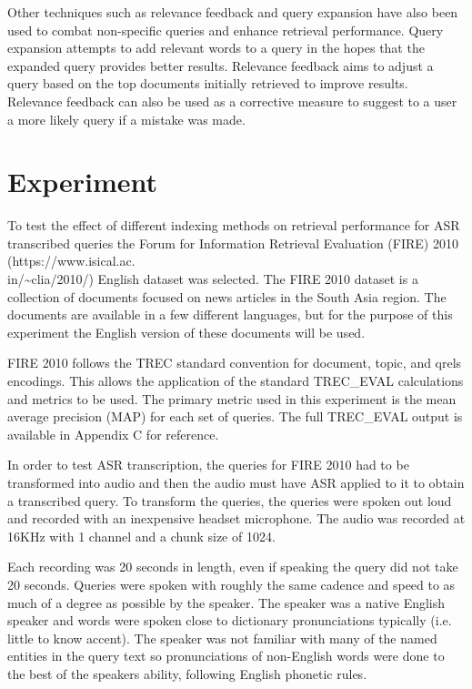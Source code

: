 \documentclass[jair, twoside,11pt,theapa]{article}
\begin{document}
Other techniques such as relevance feedback and query expansion have also been used to combat non-specific queries and enhance retrieval performance. Query expansion attempts to add relevant words to a query in the hopes that the expanded query provides better results. Relevance feedback aims to adjust a query based on the top documents initially retrieved to improve results. Relevance feedback can also be used as a corrective measure to suggest to a user a more likely query if a mistake was made. 


\section{Experiment}
\label{Experiment}
To test the effect of different indexing methods on retrieval performance for ASR transcribed queries the Forum for Information Retrieval Evaluation (FIRE) 2010 (https://www.isical.ac.\\in/\textasciitilde{}clia/2010/) English dataset was selected. The FIRE 2010 dataset is a collection of documents focused on news articles in the South Asia region. The documents are available in a few different languages, but for the purpose of this experiment the English version of these documents will be used. 

FIRE 2010 follows the TREC standard convention for document, topic, and qrels encodings. This allows the application of the standard TREC\_EVAL calculations and metrics to be used. The primary metric used in this experiment is the mean average precision (MAP) for each set of queries. The full TREC\_EVAL output is available in Appendix C for reference. 

In order to test ASR transcription, the queries for FIRE 2010 had to be transformed into audio and then the audio must have ASR applied to it to obtain a transcribed query. To transform the queries, the queries were spoken out loud and recorded with an inexpensive headset microphone. The audio was recorded at 16KHz with 1 channel and a chunk size of 1024. 

Each recording was 20 seconds in length, even if speaking the query did not take 20 seconds. Queries were spoken with roughly the same cadence and speed to as much of a degree as possible by the speaker. The speaker was a native English speaker and words were spoken close to dictionary pronunciations typically (i.e. little to know accent). The speaker was not familiar with many of the named entities in the query text so pronunciations of non-English words were done to the best of the speakers ability, following English phonetic rules. 
\end{document}
